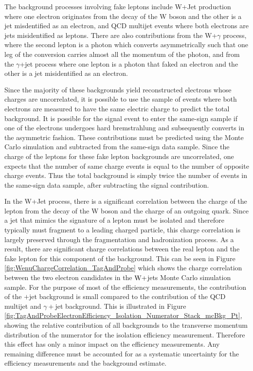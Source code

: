 \documentclass{cmspaper}
\begin{document}
The background processes involving fake leptons include W+Jet production where one electron originates from the decay of the W boson and the other is a jet misdentified as an electron, and QCD multijet events where both electrons are jets misidentified as leptons. There are also contributions from the W+$\gamma$ process, where the second lepton is a photon which converts asymmetrically such that one leg of the conversion carries almost all the momentum of the photon, and from the $\gamma$+jet process where one lepton is a photon that faked an electron and the other is a jet misidentified as an electron. 

\label{sec:SameSignMethod}
Since the majority of these backgrounds yield reconstructed electrons whose charges are uncorrelated, it is possible to use the sample of events where both electrons are measured to have the same electric charge to predict the total background. It is possible for the \Z\To\Ep\Em signal event to enter the same-sign sample if one of the electrons undergoes hard bremstrahlung and subsequently converts in the asymmetric fashion. These contributions must be predicted using the Monte Carlo simulation and subtracted from the same-sign data sample. Since the charge of the leptons for these fake lepton backgrounds are uncorrelated, one expects that the number of same charge events is equal to the number of opposite charge events. Thus the total background is simply twice the number of events in the same-sign data sample, after subtracting the signal contribution. 

In the W+Jet process, there is a significant correlation between the charge of the lepton from the decay of the W boson and the charge of an outgoing quark. Since a jet that mimics the signature of a lepton must be isolated and therefore typically must fragment to a leading charged particle, this charge correlation is largely preserved through the fragmentation and hadronization process. As a result, there are significant charge correlations between the real lepton and the fake lepton for this component of the background. This can be seen in Figure \ref{fig:WenuChargeCorrelation_TagAndProbe} which shows the charge correlation between the two electron candidates in the $\mathrm{W}+$jets Monte Carlo simulation sample. For the purpose of most of the efficiency measurements, the contribution of the \W$+$jet background is small compared to the contribution of the QCD multijet and $\gamma+$jet background. This is illustrated in Figure \ref{fig:TagAndProbeElectronEfficiency_Isolation_Numerator_Stack_mcBkg_Pt}, showing the relative contribution of all backgrounds to the transverse momentum distribution of the numerator for the isolation efficiency measurement. Therefore this effect has only a minor impact on the efficiency measurements. Any remaining difference must be accounted for as a systematic uncertainty for the efficiency measurements and the background estimate.
\end{document}

